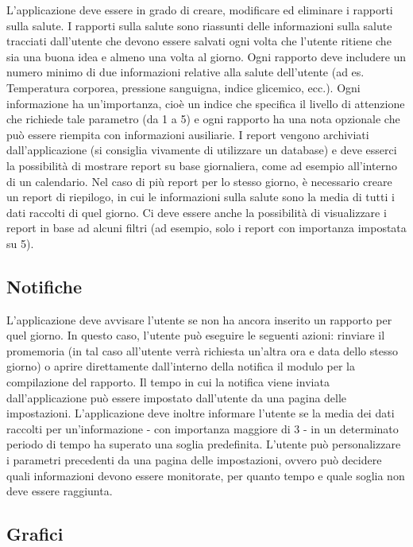 \documentclass{article}
\begin{document}
L'applicazione deve essere in grado di creare, modificare ed eliminare i rapporti sulla salute. I rapporti sulla salute sono riassunti delle informazioni sulla salute tracciati dall'utente che devono essere salvati ogni volta che l'utente ritiene che sia una buona idea e almeno una volta al giorno. Ogni rapporto deve includere un numero minimo di due informazioni relative alla salute dell'utente (ad es. Temperatura corporea, pressione sanguigna, indice glicemico, ecc.). Ogni informazione ha un'importanza, cioè un indice che specifica il livello di attenzione che richiede tale parametro (da 1 a 5) e ogni rapporto ha una nota opzionale che può essere riempita con informazioni ausiliarie. I report vengono archiviati dall'applicazione (si consiglia vivamente di utilizzare un database) e deve esserci la possibilità di mostrare report su base giornaliera, come ad esempio all'interno di un calendario. Nel caso di più report per lo stesso giorno, è necessario creare un report di riepilogo, in cui le informazioni sulla salute sono la media di tutti i dati raccolti di quel giorno. Ci deve essere anche la possibilità di visualizzare i report in base ad alcuni filtri (ad esempio, solo i report con importanza impostata su 5).

\subsection{Notifiche}

L'applicazione deve avvisare l'utente se non ha ancora inserito un rapporto per quel giorno. In questo caso, l'utente può eseguire le seguenti azioni: rinviare il promemoria (in tal caso all'utente verrà richiesta un'altra ora e data dello stesso giorno) o aprire direttamente dall'interno della notifica il modulo per la compilazione del rapporto. Il tempo in cui la notifica viene inviata dall'applicazione può essere impostato dall'utente da una pagina delle impostazioni. L'applicazione deve inoltre informare l'utente se la media dei dati raccolti per un'informazione - con importanza maggiore di 3 - in un determinato periodo di tempo ha superato una soglia predefinita. L'utente può personalizzare i parametri precedenti da una pagina delle impostazioni, ovvero può decidere quali informazioni devono essere monitorate, per quanto tempo e quale soglia non deve essere raggiunta.

\subsection{Grafici}
\end{document}

